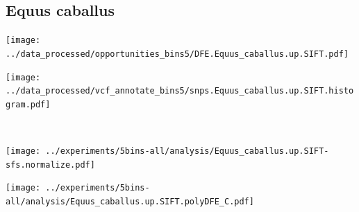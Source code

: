 \subsection{Equus caballus}

\begin{minipage}{0.49\linewidth}
    \texttt{[image: ../data\_processed/opportunities\_bins5/DFE.Equus\_caballus.up.SIFT.pdf]}
\end{minipage}
\begin{minipage}{0.49\linewidth}
    \texttt{[image: ../data\_processed/vcf\_annotate\_bins5/snps.Equus\_caballus.up.SIFT.histogram.pdf]}
\end{minipage}
\\
\begin{minipage}{0.49\linewidth}
    \texttt{[image: ../experiments/5bins-all/analysis/Equus\_caballus.up.SIFT-sfs.normalize.pdf]}
\end{minipage}
\begin{minipage}{0.4\linewidth}
    \texttt{[image: ../experiments/5bins-all/analysis/Equus\_caballus.up.SIFT.polyDFE\_C.pdf]}
\end{minipage}
